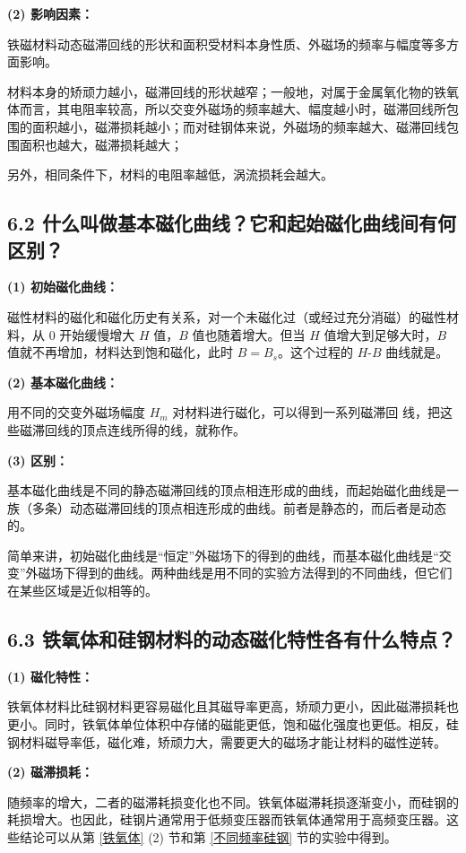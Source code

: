 \documentclass[UTF8]{article}
\theoremstyle{MyLineTheoremStyle} %
\theoremstyle{MyBlockTheoremStyle} %
\theoremstyle{MySubsubsectionStyle} %
\begin{document}
\noindent \textbf{(2) 影响因素：}

铁磁材料动态磁滞回线的形状和面积受材料本身性质、外磁场的频率与幅度等多方面影响。

材料本身的矫顽力越小，磁滞回线的形状越窄；一般地，对属于金属氧化物的铁氧体而言，其电阻率较高，所以交变外磁场的频率越大、幅度越小时，磁滞回线所包围的面积越小，磁滞损耗越小；而对硅钢体来说，外磁场的频率越大、磁滞回线包围面积也越大，磁滞损耗越大；

另外，相同条件下，材料的电阻率越低，涡流损耗会越大。


\subsection*{6.2 什么叫做基本磁化曲线？它和起始磁化曲线间有何区别？}

\noindent\textbf{(1) 初始磁化曲线：}

磁性材料的磁化和磁化历史有关系，对一个未磁化过（或经过充分消磁）的磁性材料，从 0 开始缓慢增大 $H$ 值，$B$ 值也随着增大。但当 $H$ 值增大到足够大时，$B$ 值就不再增加，材料达到饱和磁化，此时 $B = B_s$。这个过程的 $H$-$B$ 曲线就是。

\noindent\textbf{(2) 基本磁化曲线：}

用不同的交变外磁场幅度 $H_m$ 对材料进行磁化，可以得到一系列磁滞回
线，把这些磁滞回线的顶点连线所得的线，就称作。

\noindent\textbf{(3) 区别：}

基本磁化曲线是不同的静态磁滞回线的顶点相连形成的曲线，而起始磁化曲线是一族（多条）动态磁滞回线的顶点相连形成的曲线。前者是静态的，而后者是动态的。

简单来讲，初始磁化曲线是“恒定”外磁场下的得到的曲线，而基本磁化曲线是“交变”外磁场下得到的曲线。两种曲线是用不同的实验方法得到的不同曲线，但它们在某些区域是近似相等的。


\subsection*{6.3 铁氧体和硅钢材料的动态磁化特性各有什么特点？}

\noindent\textbf{(1) 磁化特性：}

铁氧体材料比硅钢材料更容易磁化且其磁导率更高，矫顽力更小，因此磁滞损耗也更小。同时，铁氧体单位体积中存储的磁能更低，饱和磁化强度也更低。相反，硅钢材料磁导率低，磁化难，矫顽力大，需要更大的磁场才能让材料的磁性逆转。

\noindent\textbf{(2) 磁滞损耗：}

随频率的增大，二者的磁滞耗损变化也不同。铁氧体磁滞耗损逐渐变小，而硅钢的耗损增大。也因此，硅钢片通常用于低频变压器而铁氧体通常用于高频变压器。这些结论可以从第 \ref{铁氧体} (2) 节和第 \ref{不同频率硅钢} 节的实验中得到。
\end{document}
